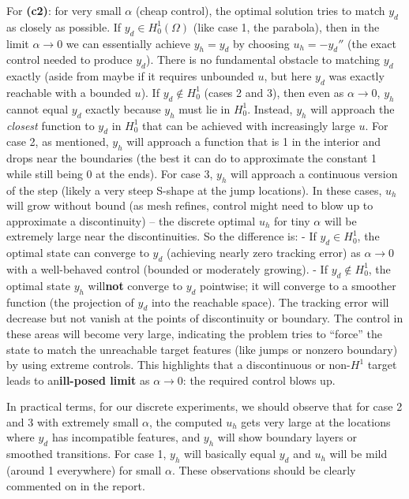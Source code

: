 \documentclass[a4paper,10pt]{article}
\begin{document}
For \textbf{(c2)}: for very small \(\alpha\) (cheap control), the optimal solution tries to match \(y_d\) as closely as possible. If \(y_d \in H^1_0(\Omega)\) (like case 1, the parabola), then in the limit \(\alpha \to 0\) we can essentially achieve \(y_h = y_d\) by choosing \(u_h = -y_d''\) (the exact control needed to produce \(y_d\)). There is no fundamental obstacle to matching \(y_d\) exactly (aside from maybe if it requires unbounded \(u\), but here \(y_d\) was exactly reachable with a bounded \(u\)). If \(y_d \notin H^1_0\) (cases 2 and 3), then even as \(\alpha \to 0\), \(y_h\) cannot equal \(y_d\) exactly because \(y_h\) must lie in \(H^1_0\). Instead, \(y_h\) will approach the \emph{closest} function to \(y_d\) in \(H^1_0\) that can be achieved with increasingly large \(u\). For case 2, as mentioned, \(y_h\) will approach a function that is 1 in the interior and drops near the boundaries (the best it can do to approximate the constant 1 while still being 0 at the ends). For case 3, \(y_h\) will approach a continuous version of the step (likely a very steep S-shape at the jump locations). In these cases, \(u_h\) will grow without bound (as mesh refines, control might need to blow up to approximate a discontinuity) – the discrete optimal \(u_h\) for tiny \(\alpha\) will be extremely large near the discontinuities. So the difference is:
- If \(y_d \in H^1_0\), the optimal state can converge to \(y_d\) (achieving nearly zero tracking error) as \(\alpha \to 0\) with a well-behaved control (bounded or moderately growing).
- If \(y_d \notin H^1_0\), the optimal state \(y_h\) will\textbf{not} converge to \(y_d\) pointwise; it will converge to a smoother function (the projection of \(y_d\) into the reachable space). The tracking error will decrease but not vanish at the points of discontinuity or boundary. The control in these areas will become very large, indicating the problem tries to “force” the state to match the unreachable target features (like jumps or nonzero boundary) by using extreme controls. This highlights that a discontinuous or non-\(H^1\) target leads to an\textbf{ill-posed limit} as \(\alpha \to 0\): the required control blows up.

In practical terms, for our discrete experiments, we should observe that for case 2 and 3 with extremely small \(\alpha\), the computed \(u_h\) gets very large at the locations where \(y_d\) has incompatible features, and \(y_h\) will show boundary layers or smoothed transitions. For case 1, \(y_h\) will basically equal \(y_d\) and \(u_h\) will be mild (around 1 everywhere) for small \(\alpha\). These observations should be clearly commented on in the report.
\end{document}
